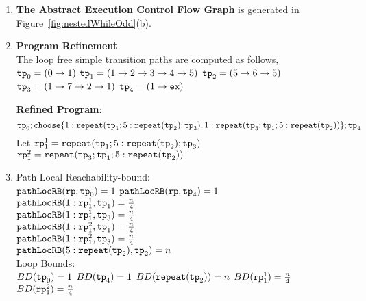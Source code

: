   \begin{enumerate}
    \item  \textbf{The Abstract Execution Control Flow Graph} is generated in Figure~\ref{fig:nestedWhileOdd}(b).
    \item \textbf{Program Refinement}
    \\
    The loop free simple transition paths are computed as follows,
      \\ 
    $\mathtt{tp}_0 = (0 \to 1)$
      \quad
      $\mathtt{tp}_1 = (1 \to 2 \to 3 \to 4 \to 5)$
      \quad
      $\mathtt{tp}_2 = (5 \to 6 \to 5)$
      \quad
      $\mathtt{tp}_3 = (1 \to 7 \to 2 \to 1)$
      \quad
      $\mathtt{tp}_4 = (1 \to \mathtt{ex})$

  \textbf{Refined Program}:
  \[
    \tpath_0 ; \rpchoose{1: \rprepeat(\tpath_1; 5:\rprepeat(\tpath_2); \tpath_3) , 
    1: \rprepeat(\tpath_3; \tpath_1; 5:\rprepeat(\tpath_2))}; \tpath_4
    \]
    Let $\mathtt{rp}_1^1 = \mathtt{repeat}(\mathtt{tp}_1; 5:\mathtt{repeat}(\mathtt{tp}_2); \mathtt{tp}_3)$
    \\
    $\mathtt{rp}_1^2 = \mathtt{repeat}(\mathtt{tp}_3; \mathtt{tp}_1; 5:\mathtt{repeat}(\mathtt{tp}_2))$
    \item {Path Local Reachability-bound}:
    \\
    $\mathtt{pathLocRB}(\mathtt{rp}, \mathtt{tp}_0) = 1$ \quad
    $\mathtt{pathLocRB}(\mathtt{rp}, \mathtt{tp}_4) = 1$ \\
    $\mathtt{pathLocRB}(1: \mathtt{rp}_1^1, \mathtt{tp}_1) = \frac{n}{4}$ \\
    $\mathtt{pathLocRB}(1: \mathtt{rp}_1^1, \mathtt{tp}_3) = \frac{n}{4}$ \\
    $\mathtt{pathLocRB}(1: \mathtt{rp}_1^2, \mathtt{tp}_1) = \frac{n}{4}$ \\
    $\mathtt{pathLocRB}(1: \mathtt{rp}_1^2, \mathtt{tp}_3) = \frac{n}{4}$ \\
    $\mathtt{pathLocRB}(5: \mathtt{repeat}(\mathtt{tp}_2), \mathtt{tp}_2) = n$ 
    \\
    Loop Bounds:
    \\
    $BD(\mathtt{tp}_0) = 1$
    \quad
    $BD(\mathtt{tp}_4) = 1$
    \quad
    $BD(\mathtt{repeat}(\mathtt{tp}_2)) = n $
    \quad
    $BD(\mathtt{rp}_1^1) = \frac{n}{4} $
    \quad
    $BD(\mathtt{rp}_1^2) = \frac{n}{4} $


\end{enumerate}

